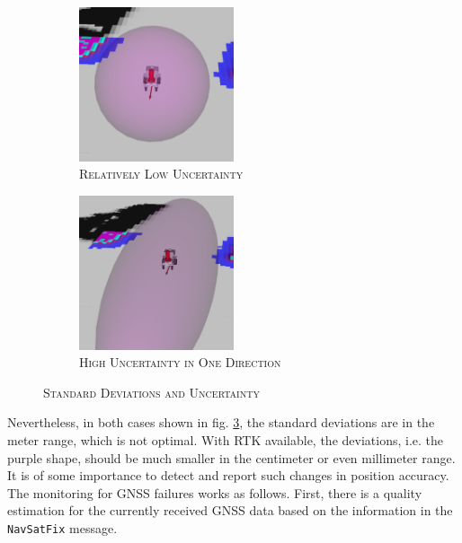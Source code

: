 \documentclass[english, master, utf8]{base/thesis_KBS}
\newcommand{\code}[1]{\colorbox{light-gray}{\texttt{#1}}}
\begin{document}
\begin{figure}[H]
    \centering
    \begin{subfigure}[b]{0.49\textwidth}
        \centering
        \includegraphics[width=0.5\textwidth]{pics/GNSS_cov_low.png}
        \caption{\textsc{Relatively Low Uncertainty}}
        \label{fig:low_uncertainty}
    \end{subfigure}
    \hfill
    \begin{subfigure}[b]{0.49\textwidth}
        \centering
        \includegraphics[width=0.5\textwidth]{pics/GNSS_cov_high.png}
        \caption{\textsc{High Uncertainty in One Direction}}
        \label{fig:high_uncertainty}
    \end{subfigure}
\caption{\textsc{Standard Deviations and Uncertainty}}
\label{fig:uncertainty_shape}
\end{figure}
\noindent
Nevertheless, in both cases shown in fig. \ref{fig:uncertainty_shape}, the standard deviations are in the meter range, which is not optimal. With RTK available, the deviations,
i.e. the purple shape, should be much smaller in the centimeter or even millimeter range. It is of some importance to detect and report such changes in position accuracy.
The monitoring for GNSS failures works as follows. First, there is a quality estimation for the currently received GNSS data based on the information in the \code{NavSatFix} message.
\end{document}
